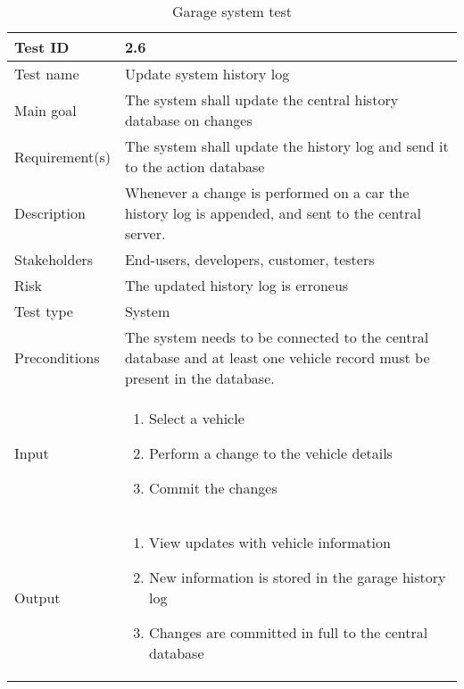 \begin{table}[H]
\centering
\caption{Garage system test}
\begin{tabularx}{1.0\textwidth}{
    |p{}     %
    |p{}|    %
}
\hline

Test ID
& 2.6
\\
\hline

Test name
& Update system history log
\\
\hline

Main goal
& The system shall update the central history database on changes
\\
\hline

Requirement(s)
& The system shall update the history log and send it to the action database
\\
\hline

Description
& Whenever a change is performed on a car the history log is appended, and sent to the central server.
\\
\hline

Stakeholders
& End-users, developers, customer, testers
\\
\hline

Risk
& The updated history log is erroneus
\\
\hline

Test type
& System
\\
\hline

Preconditions
& The system needs to be connected to the central database and at least one vehicle record must be present in the database.
\\
\hline

Input
& \begin{enumerate}
    \item Select a vehicle
    \item Perform a change to the vehicle details
    \item Commit the changes
\end{enumerate}
\\
\hline

Output
& \begin{enumerate}
    \item View updates with vehicle information
    \item New information is stored in the garage history log
    \item Changes are committed in full to the central database
\end{enumerate}
\\
\hline


\end{tabularx}
\end{table}
